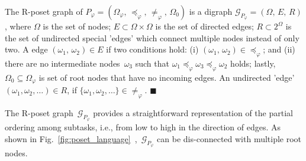 \begin{definition}\label{def:poset-graph}
The R-poset graph of $P_{\varphi}=(\Omega_\varphi,\,\preceq_{\varphi},\,\neq_{\varphi},
\,\Omega_0)$ is a digraph $\mathcal{G}_{P_\varphi}=(\Omega,\,E,\,R)$,
where $\Omega$ is the set of nodes;
$E\subset \Omega \times \Omega$ is the set of directed edges;
$R\subset 2^\Omega$ is the set of undirected special 'edges' which
connect multiple nodes instead of only two.
A edge $(\omega_1,\,\omega_2)\in E$ if two conditions hold:
(i) $(\omega_1,\, \omega_2)\in \preceq_{\varphi}$;
{and} (ii) there are no intermediate nodes~$\omega_3$ such that
$\omega_1\preceq_{\varphi} \omega_3 \preceq_{\varphi} \omega_2$ holds;
lastly, $\Omega_0\subseteq \Omega_\varphi$ is set of root nodes that 
have no incoming edges. An undirected 'edge' $(\omega_1,\omega_2,\dots)\in R$, if $\{\omega_1,\omega_2,\dots\}\in \neq_{\varphi}$.
\hfill $\blacksquare$
 \end{definition}

The R-poset graph~$\mathcal{G}_{P_\varphi}$ provides a straightforward
representation of the partial ordering among subtasks,
i.e., from low to high in the direction of edges.
As shown in Fig.~\ref{fig:poset_language}~,~$\mathcal{G}_{P_\varphi}$ can be dis-connected with multiple root nodes.

